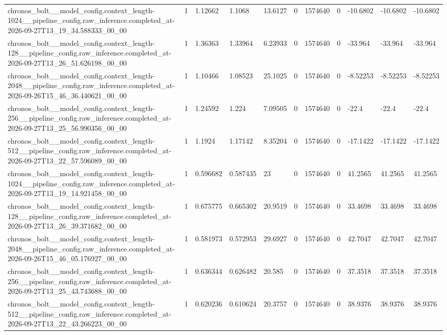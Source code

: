 \begin{tabular}{lllllllllll}
chronos\_bolt\_\_model\_config.context\_length-1024\_\_pipeline\_config.raw\_inference.completed\_at-2026-09-27T13\_19\_34.588333\_00\_00 & 1 & 1.12662 & 1.1068 & 13.6127 & 0 & 1574640 & 0 & -10.6802 & -10.6802 & -10.6802 \\
chronos\_bolt\_\_model\_config.context\_length-128\_\_pipeline\_config.raw\_inference.completed\_at-2026-09-27T13\_26\_51.626198\_00\_00 & 1 & 1.36363 & 1.33964 & 6.23933 & 0 & 1574640 & 0 & -33.964 & -33.964 & -33.964 \\
chronos\_bolt\_\_model\_config.context\_length-2048\_\_pipeline\_config.raw\_inference.completed\_at-2026-09-26T15\_46\_36.440621\_00\_00 & 1 & 1.10466 & 1.08523 & 25.1025 & 0 & 1574640 & 0 & -8.52253 & -8.52253 & -8.52253 \\
chronos\_bolt\_\_model\_config.context\_length-256\_\_pipeline\_config.raw\_inference.completed\_at-2026-09-27T13\_25\_56.990356\_00\_00 & 1 & 1.24592 & 1.224 & 7.09505 & 0 & 1574640 & 0 & -22.4 & -22.4 & -22.4 \\
chronos\_bolt\_\_model\_config.context\_length-512\_\_pipeline\_config.raw\_inference.completed\_at-2026-09-27T13\_22\_57.596089\_00\_00 & 1 & 1.1924 & 1.17142 & 8.35204 & 0 & 1574640 & 0 & -17.1422 & -17.1422 & -17.1422 \\
chronos\_bolt\_\_model\_config.context\_length-1024\_\_pipeline\_config.raw\_inference.completed\_at-2026-09-27T13\_19\_14.921458\_00\_00 & 1 & 0.596682 & 0.587435 & 23 & 0 & 1574640 & 0 & 41.2565 & 41.2565 & 41.2565 \\
chronos\_bolt\_\_model\_config.context\_length-128\_\_pipeline\_config.raw\_inference.completed\_at-2026-09-27T13\_26\_39.371682\_00\_00 & 1 & 0.675775 & 0.665302 & 20.9519 & 0 & 1574640 & 0 & 33.4698 & 33.4698 & 33.4698 \\
chronos\_bolt\_\_model\_config.context\_length-2048\_\_pipeline\_config.raw\_inference.completed\_at-2026-09-26T15\_46\_05.176927\_00\_00 & 1 & 0.581973 & 0.572953 & 29.6927 & 0 & 1574640 & 0 & 42.7047 & 42.7047 & 42.7047 \\
chronos\_bolt\_\_model\_config.context\_length-256\_\_pipeline\_config.raw\_inference.completed\_at-2026-09-27T13\_25\_43.743688\_00\_00 & 1 & 0.636344 & 0.626482 & 20.585 & 0 & 1574640 & 0 & 37.3518 & 37.3518 & 37.3518 \\
chronos\_bolt\_\_model\_config.context\_length-512\_\_pipeline\_config.raw\_inference.completed\_at-2026-09-27T13\_22\_43.266223\_00\_00 & 1 & 0.620236 & 0.610624 & 20.3757 & 0 & 1574640 & 0 & 38.9376 & 38.9376 & 38.9376 \\

\end{tabular}
